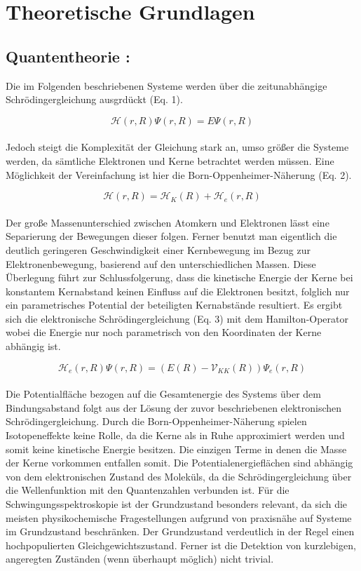 %
%

\section{Theoretische Grundlagen}
\subsection{Quantentheorie :}
Die im Folgenden beschriebenen Systeme werden über die zeitunabhängige Schrödingergleichung ausgrdückt (Eq. 1). 

\begin {equation}
\mathcal{H}\left(r,R\right)\Psi\left(r,R\right)=E\Psi\left(r,R\right)
\end {equation}
\\
Jedoch steigt die Komplexität der Gleichung stark an, umso größer die Systeme werden, da sämtliche Elektronen und Kerne betrachtet werden müssen. Eine Möglichkeit der Vereinfachung ist hier die Born-Oppenheimer-Näherung (Eq. 2). 

\begin {equation}
\mathcal{H}\left(r,R\right)=\mathcal{H}_{K}\left(R\right)+\mathcal{H}_{e}\left(r,R\right)
\end {equation}
\\
Der große Massenunterschied zwischen Atomkern und Elektronen lässt eine Separierung der Bewegungen dieser folgen. Ferner benutzt man eigentlich die deutlich geringeren Geschwindigkeit einer Kernbewegung im Bezug zur Elektronenbewegung, basierend auf den unterschiedlichen Massen. Diese Überlegung führt zur Schlussfolgerung, dass die kinetische Energie der Kerne bei konstantem Kernabstand keinen Einfluss auf die Elektronen besitzt, folglich nur ein parametrisches Potential der beteiligten Kernabstände resultiert. Es ergibt sich die elektronische Schrödingergleichung (Eq. 3) mit dem Hamilton-Operator wobei die Energie nur noch parametrisch von den Koordinaten der Kerne abhängig ist.

\begin {equation}
\mathcal{H}_e\left(r,R\right)\Psi\left(r,R\right)=\left(E\left(R\right)-\mathcal{V}_{KK}\left(R\right)\right)\Psi_e\left(r,R\right)
\end {equation}
\\
Die Potentialfläche bezogen auf die Gesamtenergie des Systems über dem Bindungsabstand folgt aus der Lösung der zuvor beschriebenen elektronischen Schrödingergleichung. Durch die Born-Oppenheimer-Näherung spielen Isotopeneffekte keine Rolle, da die Kerne als in Ruhe approximiert werden und somit keine kinetische Energie besitzen. Die einzigen Terme in denen die Masse der Kerne vorkommen entfallen somit. Die Potentialenergieflächen sind abhängig von dem elektronischen Zustand des Moleküls, da die Schrödingergleichung über die Wellenfunktion mit den Quantenzahlen verbunden ist. Für die Schwingungsspektroskopie ist der Grundzustand besonders relevant, da sich die meisten physikochemische Fragestellungen aufgrund von praxisnähe auf Systeme im Grundzustand beschränken. Der Grundzustand verdeutlich in der Regel einen hochpopulierten Gleichgewichtszustand. Ferner ist die Detektion von kurzlebigen, angeregten Zuständen (wenn überhaupt möglich) nicht trivial.
